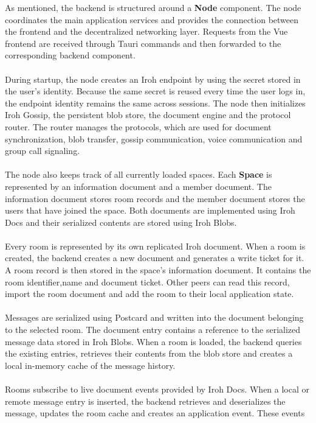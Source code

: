 \documentclass{article} %
\begin{document}
As mentioned, the backend is structured around a \textbf{Node} component. The node
coordinates the main application services and provides the connection between
the frontend and the decentralized networking layer. Requests from the Vue
frontend are received through Tauri commands and then forwarded to the
corresponding backend component.
\\
\\
During startup, the node creates an Iroh endpoint by using the secret stored in the user’s identity. Because the same secret is reused every time the user logs in, the endpoint identity remains the same across sessions. The node then initializes Iroh Gossip, the persistent blob store, the document engine and the protocol router. The router manages the protocols, which are used for document synchronization, blob transfer, gossip communication, voice communication and group call signaling.
\\
\\
The node also keeps track of all currently
loaded spaces. Each \textbf{Space} is represented by an information document
and a member document. The information document stores room records and the
member document stores the users that have joined the space. Both documents are
implemented using Iroh Docs and their serialized contents are stored using
Iroh Blobs.
\\
\\
Every room is represented by its own replicated Iroh document. When a room is
created, the backend creates a new document and generates a write ticket for it.
A room record is then
stored in the space's information document. It contains the room identifier,name and document ticket. Other peers can read this record,
import the room document and add the room to their local application state.
\\
\\
Messages are serialized using Postcard and written into the document belonging
to the selected room. The document entry contains a reference to the serialized
message data stored in Iroh Blobs. When a room is loaded, the backend queries
the existing entries, retrieves their contents from the blob store and creates
a local in-memory cache of the message history.
\\
\\
Rooms subscribe to live document events provided by Iroh Docs. When a local or
remote message entry is inserted, the backend retrieves and deserializes the
message, updates the room cache and creates an application event. These events
\end{document}
